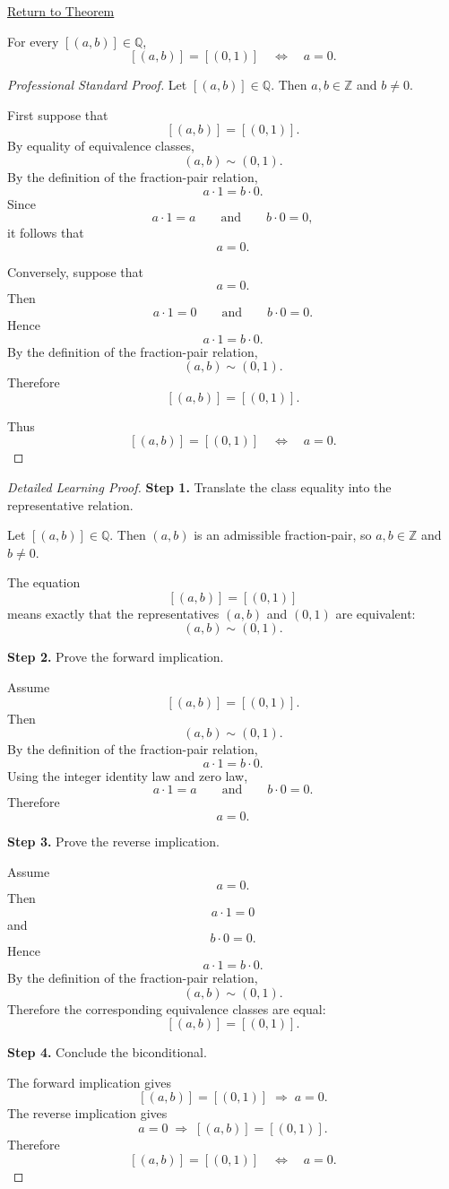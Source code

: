 \newpage
{}
\label{prf:ec-zero-numerator}

\begin{remark*}[Return]
\hyperref[thm:ec-zero-numerator]{Return to Theorem}
\end{remark*}

\begin{theorem*}
For every $[(a,b)]\in\mathbb{Q}$,
\[
[(a,b)] = [(0,1)]
\quad\Longleftrightarrow\quad
a = 0.
\]
\end{theorem*}

\begin{proof}[Professional Standard Proof]
\LRAProofBodyStart
Let $[(a,b)]\in\mathbb{Q}$. Then $a,b\in\mathbb{Z}$ and $b\neq 0$.

First suppose that
\[
[(a,b)] = [(0,1)].
\]
By equality of equivalence classes,
\[
(a,b)\sim(0,1).
\]
By the definition of the fraction-pair relation,
\[
a\cdot 1=b\cdot 0.
\]
Since
\[
a\cdot 1=a
\qquad\text{and}\qquad
b\cdot 0=0,
\]
it follows that
\[
a=0.
\]

Conversely, suppose that
\[
a=0.
\]
Then
\[
a\cdot 1=0
\qquad\text{and}\qquad
b\cdot 0=0.
\]
Hence
\[
a\cdot 1=b\cdot 0.
\]
By the definition of the fraction-pair relation,
\[
(a,b)\sim(0,1).
\]
Therefore
\[
[(a,b)] = [(0,1)].
\]

Thus
\[
[(a,b)] = [(0,1)]
\quad\Longleftrightarrow\quad
a=0.
\]
\end{proof}

\begin{proof}[Detailed Learning Proof]
\LRAProofBodyStart

\textbf{Step 1.} Translate the class equality into the representative relation.

Let $[(a,b)]\in\mathbb{Q}$. Then $(a,b)$ is an admissible fraction-pair,
so $a,b\in\mathbb{Z}$ and $b\neq 0$.

The equation
\[
[(a,b)] = [(0,1)]
\]
means exactly that the representatives $(a,b)$ and $(0,1)$ are equivalent:
\[
(a,b)\sim(0,1).
\]

\textbf{Step 2.} Prove the forward implication.

Assume
\[
[(a,b)] = [(0,1)].
\]
Then
\[
(a,b)\sim(0,1).
\]
By the definition of the fraction-pair relation,
\[
a\cdot 1=b\cdot 0.
\]
Using the integer identity law and zero law,
\[
a\cdot 1=a
\qquad\text{and}\qquad
b\cdot 0=0.
\]
Therefore
\[
a=0.
\]

\textbf{Step 3.} Prove the reverse implication.

Assume
\[
a=0.
\]
Then
\[
a\cdot 1=0
\]
and
\[
b\cdot 0=0.
\]
Hence
\[
a\cdot 1=b\cdot 0.
\]
By the definition of the fraction-pair relation,
\[
(a,b)\sim(0,1).
\]
Therefore the corresponding equivalence classes are equal:
\[
[(a,b)] = [(0,1)].
\]

\textbf{Step 4.} Conclude the biconditional.

The forward implication gives
\[
[(a,b)] = [(0,1)] \;\Longrightarrow\; a=0.
\]
The reverse implication gives
\[
a=0 \;\Longrightarrow\; [(a,b)] = [(0,1)].
\]
Therefore
\[
[(a,b)] = [(0,1)]
\quad\Longleftrightarrow\quad
a=0.
\]
\end{proof}

